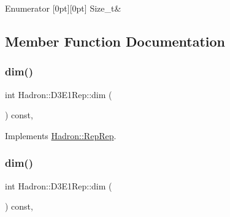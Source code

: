 \begin{DoxyEnumFields}{Enumerator}
[0pt][0pt]{}\mbox{\label{structHadron_1_1D3E1Rep_a25d2e245febe0dfbaba5fb9846dc3666a85f1e1ab47e0ae866d8df43d2fac9d45}} 
Size\+\_\+t&\\
\hline

\end{DoxyEnumFields}


\subsection{Member Function Documentation}
\mbox{\label{structHadron_1_1D3E1Rep_af48681bf92a948c02889dcaa4a44812b}} 
\subsubsection{\texorpdfstring{dim()}{dim()}\hspace{0.1cm}{\footnotesize\ttfamily [1/3]}}
{\footnotesize\ttfamily int Hadron\+::\+D3\+E1\+Rep\+::dim (\begin{DoxyParamCaption}{ }\end{DoxyParamCaption}) const\hspace{0.3cm}{\ttfamily [inline]}, {\ttfamily [virtual]}}



Implements \mbox{\hyperlink{structHadron_1_1RepRep_a92c8802e5ed7afd7da43ccfd5b7cd92b}{Hadron\+::\+Rep\+Rep}}.

\mbox{\label{structHadron_1_1D3E1Rep_af48681bf92a948c02889dcaa4a44812b}} 
\subsubsection{\texorpdfstring{dim()}{dim()}\hspace{0.1cm}{\footnotesize\ttfamily [2/3]}}
{\footnotesize\ttfamily int Hadron\+::\+D3\+E1\+Rep\+::dim (\begin{DoxyParamCaption}{ }\end{DoxyParamCaption}) const\hspace{0.3cm}{\ttfamily [inline]}, {\ttfamily [virtual]}}



